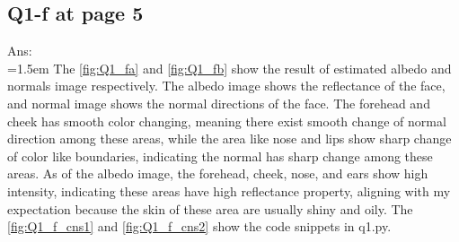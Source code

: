\documentclass{article}
\begin{document}
	\subsection*{Q1-f at page 5}
	Ans:\\
	\hangindent=1.5em \hspace{1.5em} The \autoref{fig:Q1_fa} and \autoref{fig:Q1_fb} show the result of estimated albedo and normals image respectively. The albedo image shows the reflectance of the face, and normal image shows the normal directions of the face. The forehead and cheek has smooth color changing, meaning there exist smooth change of normal direction among these areas, while the area like nose and lips show sharp change of color like boundaries, indicating the normal has sharp change among these areas. As of the albedo image, the forehead, cheek, nose, and ears show high intensity, indicating these areas have high reflectance property, aligning with my expectation because the skin of these area are usually shiny and oily. The \autoref{fig:Q1_f_cns1} and \autoref{fig:Q1_f_cns2} show the code snippets in q1.py.
	\newline
	
\end{document}
